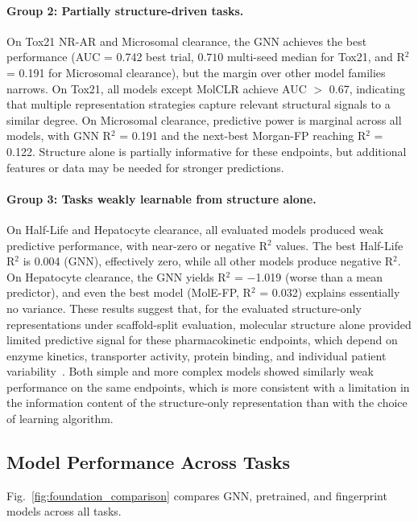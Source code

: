 \documentclass[journal]{IEEEtran}
\begin{document}
\paragraph{Group 2: Partially structure-driven tasks.}
On Tox21 NR-AR and Microsomal clearance, the GNN achieves the best performance (AUC = 0.742 best trial, $0.710$ multi-seed median for Tox21, and R$^2$ = 0.191 for Microsomal clearance), but the margin over other model families narrows. On Tox21, all models except MolCLR achieve AUC $>$ 0.67, indicating that multiple representation strategies capture relevant structural signals to a similar degree. On Microsomal clearance, predictive power is marginal across all models, with GNN R$^2$ = 0.191 and the next-best Morgan-FP reaching R$^2$ = 0.122. Structure alone is partially informative for these endpoints, but additional features or data may be needed for stronger predictions.

\paragraph{Group 3: Tasks weakly learnable from structure alone.}
On Half-Life and Hepatocyte clearance, all evaluated models produced weak predictive performance, with near-zero or negative R$^2$ values. The best Half-Life R$^2$ is 0.004 (GNN), effectively zero, while all other models produce negative R$^2$. On Hepatocyte clearance, the GNN yields R$^2$ = $-$1.019 (worse than a mean predictor), and even the best model (MolE-FP, R$^2$ = 0.032) explains essentially no variance. These results suggest that, for the evaluated structure-only representations under scaffold-split evaluation, molecular structure alone provided limited predictive signal for these pharmacokinetic endpoints, which depend on enzyme kinetics, transporter activity, protein binding, and individual patient variability~\cite{obach1999prediction}. Both simple and more complex models showed similarly weak performance on the same endpoints, which is more consistent with a limitation in the information content of the structure-only representation than with the choice of learning algorithm.

\subsection{Model Performance Across Tasks}
\label{sec:model_performance}

Fig.~\ref{fig:foundation_comparison} compares GNN, pretrained, and fingerprint models across all tasks.
\end{document}
